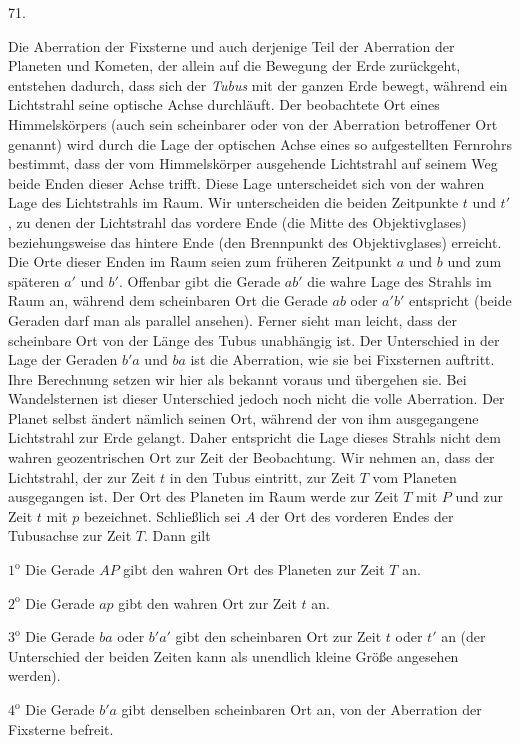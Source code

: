 \par{}\medskip
\hypertarget{native-091-article071}{}
\begin{center}71.\end{center}
Die Aberration der Fixsterne und auch derjenige Teil der Aberration der Planeten und Kometen, der allein auf die Bewegung der Erde zurückgeht, entstehen dadurch, dass sich der \emph{Tubus} mit der ganzen Erde bewegt, während ein Lichtstrahl seine optische Achse durchläuft. Der beobachtete Ort eines Himmelskörpers (auch sein scheinbarer oder von der Aberration betroffener Ort genannt) wird durch die Lage der optischen Achse eines so aufgestellten Fernrohrs bestimmt, dass der vom Himmelskörper ausgehende Lichtstrahl auf seinem Weg beide Enden dieser Achse trifft. Diese Lage unterscheidet sich von der wahren Lage des Lichtstrahls im Raum. Wir unterscheiden die beiden Zeitpunkte $t$ und $t'$, zu denen der Lichtstrahl das vordere Ende (die Mitte des Objektivglases) beziehungsweise das hintere Ende (den Brennpunkt des Objektivglases) erreicht. Die Orte dieser Enden im Raum seien zum früheren Zeitpunkt $a$ und $b$ und zum späteren $a'$ und $b'$. Offenbar gibt die Gerade $ab'$ die wahre Lage des Strahls im Raum an, während dem scheinbaren Ort die Gerade $ab$ oder $a'b'$ entspricht (beide Geraden darf man als parallel ansehen). Ferner sieht man leicht, dass der scheinbare Ort von der Länge des Tubus unabhängig ist. Der Unterschied in der Lage der Geraden $b'a$ und $ba$ ist die Aberration, wie sie bei Fixsternen auftritt. Ihre Berechnung setzen wir hier als bekannt voraus und übergehen sie. Bei Wandelsternen ist dieser Unterschied jedoch noch nicht die volle Aberration. Der Planet selbst ändert nämlich seinen Ort, während der von ihm ausgegangene Lichtstrahl zur Erde gelangt. Daher entspricht die Lage dieses Strahls nicht dem wahren geozentrischen Ort zur Zeit der Beobachtung. Wir nehmen an, dass der Lichtstrahl, der zur Zeit $t$ in den Tubus eintritt, zur Zeit $T$ vom Planeten ausgegangen ist. Der Ort des Planeten im Raum werde zur Zeit $T$ mit $P$ und zur Zeit $t$ mit $p$ bezeichnet. Schließlich sei $A$ der Ort des vorderen Endes der Tubusachse zur Zeit $T$. Dann gilt
\par $1^{\mathrm{o}}$ Die Gerade $AP$ gibt den wahren Ort des Planeten zur Zeit $T$ an.
\par $2^{\mathrm{o}}$ Die Gerade $ap$ gibt den wahren Ort zur Zeit $t$ an.
\par $3^{\mathrm{o}}$ Die Gerade $ba$ oder $b'a'$ gibt den scheinbaren Ort zur Zeit $t$ oder $t'$ an (der Unterschied der beiden Zeiten kann als unendlich kleine Größe angesehen werden).
\par $4^{\mathrm{o}}$ Die Gerade $b'a$ gibt denselben scheinbaren Ort an, von der Aberration der Fixsterne befreit.

